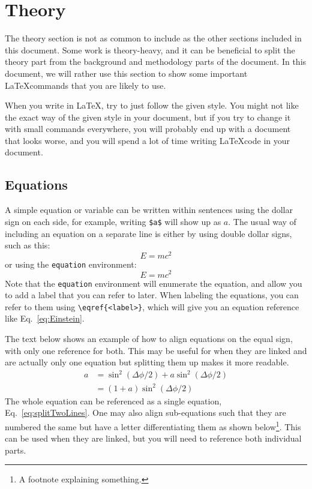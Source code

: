 \chapter{Theory}
\label{chap:Theory}

The theory section is not as common to include as the other sections included in this document. Some work is theory-heavy, and it can be beneficial to split the theory part from the background and methodology parts of the document. In this document, we will rather use this section to show some important \LaTeX commands that you are likely to use.

When you write in \LaTeX, try to just follow the given style. You might not like the exact way of the given style in your document, but if you try to change it with small commands everywhere, you will probably end up with a document that looks worse, and you will spend a lot of time writing \LaTeX code in your document.

\section{Equations}

A simple equation or variable can be written within sentences using the dollar sign on each side, for example, writing \verb=$a$= will show up as $a$. The usual way of including an equation on a separate line is either by using double dollar signs, such as this:
$$E = mc^2$$
or using the \texttt{equation} environment:
\begin{equation}
    E=mc^2
    \label{eq:Einstein}
\end{equation}
\sloppy Note that the \texttt{equation} environment will enumerate the equation, and allow you to add a label that you can refer to later. When labeling the equations, you can refer to them using \verb=\eqref{<label>}=, which will give you an equation reference like Eq.~\eqref{eq:Einstein}.

The text below shows an example of how to align equations on the equal sign, with only one reference for both. This may be useful for when they are linked and are actually only one equation but splitting them up makes it more readable.
\begin{equation}
\begin{aligned}
        a &= \sin^{2}(\Delta\phi/2) + a \sin^{2}(\Delta\phi/2) \\
         &= (1+a) \sin^{2}(\Delta\phi/2)
\end{aligned}
\label{eq:splitTwoLines}
\end{equation}
The whole equation can be referenced as a single equation, Eq.~\eqref{eq:splitTwoLines}. One may also align sub-equations such that they are numbered the same but have a letter differentiating them as shown below\footnote{A footnote explaining something.}. This can be used when they are linked, but you will need to reference both individual parts.

